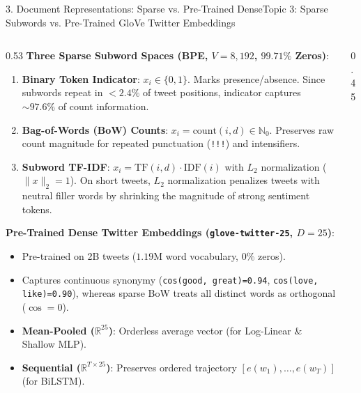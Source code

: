 \documentclass[aspectratio=169, 10pt]{beamer}
\begin{document}
\begin{frame}[shrink=8]{3. Document Representations: Sparse vs. Pre-Trained Dense}{Topic 3: Sparse Subwords vs. Pre-Trained GloVe Twitter Embeddings}
\begin{columns}[T]
\begin{column}{0.53\textwidth}
    \scriptsize
    \textbf{Three Sparse Subword Spaces (BPE, $V = 8,192$, $99.71\%$ Zeros)}:
    \begin{enumerate}\setlength\itemsep{1.2pt}
        \item \textbf{Binary Token Indicator}: $x_i \in \{0, 1\}$. Marks presence/absence. Since subwords repeat in $<2.4\%$ of tweet positions, indicator captures $\sim 97.6\%$ of count information.
        \item \textbf{Bag-of-Words (BoW) Counts}: $x_i = \text{count}(i, d) \in \mathbb{N}_0$. Preserves raw count magnitude for repeated punctuation (\texttt{!!!}) and intensifiers.
        \item \textbf{Subword TF-IDF}: $x_i = \text{TF}(i, d) \cdot \text{IDF}(i)$ with $L_2$ normalization ($\|x\|_2=1$). On short tweets, $L_2$ normalization penalizes tweets with neutral filler words by shrinking the magnitude of strong sentiment tokens.
    \end{enumerate}
    \vspace{2pt}
    \textbf{Pre-Trained Dense Twitter Embeddings (\texttt{glove-twitter-25}, $D = 25$)}:
    \begin{itemize}\setlength\itemsep{1.2pt}
        \item Pre-trained on 2B tweets ($1.19\text{M}$ word vocabulary, $0\%$ zeros).
        \item Captures continuous synonymy (\texttt{cos(good, great)=0.94}, \texttt{cos(love, like)=0.90}), whereas sparse BoW treats all distinct words as orthogonal ($\cos = 0$).
        \item \textbf{Mean-Pooled ($\mathbb{R}^{25}$)}: Orderless average vector (for Log-Linear \& Shallow MLP).
        \item \textbf{Sequential ($\mathbb{R}^{T \times 25}$)}: Preserves ordered trajectory $[e(w_1), \dots, e(w_T)]$ (for BiLSTM).
    \end{itemize}
\end{column}
\begin{column}{0.45\textwidth}

\end{column}
\end{columns}
\end{frame}
\end{document}
